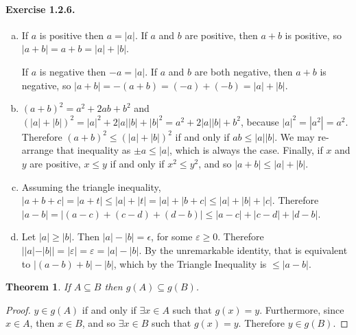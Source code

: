 \documentclass{article}
\newtheorem{theorem}{Theorem}[section]
\begin{document}
\paragraph{Exercise 1.2.6.}
\begin{enumerate}[(a)]
    \item  If $a$ is positive then $a=|a|$. If $a$ and $b$ are positive, then $a+b$ is positive, so $|a+b|=a+b=|a|+|b|$.
    
    If $a$ is negative then $-a=|a|$. If $a$ and $b$ are both negative, then $a+b$ is negative, so $|a+b|=-(a+b)=(-a)+(-b)=|a|+|b|$.

    \item $(a+b)^2=a^2+2ab+b^2$ and $(|a|+|b|)^2=|a|^2+2|a||b|+|b|^2=a^2+2|a||b|+b^2$, because $|a|^2=|a^2|=a^2$. Therefore $(a+b)^2 \leq (|a|+| b|)^2$ if and only if $ab\leq|a||b|$. We may re-arrange that inequality as $\pm a\leq |a|$, which is always the case. Finally, if $x$ and $y$ are positive, $x\leq y$ if and only if $x^2\leq y^2$, and so $|a+b|\leq|a|+|b|$.

    \item Assuming the triangle inequality, $|a+b+c|=|a+t|\leq|a|+|t|=|a|+|b+c|\leq|a|+|b|+|c|$. Therefore $|a-b|=|(a-c)+(c-d)+(d-b)|\leq |a-c|+|c-d|+|d-b|$.

    \item Let $|a|\geq |b|$. Then $|a|-|b|=\epsilon$, for some $\varepsilon \geq0$. Therefore $||a|-|b||=|\varepsilon|=\varepsilon=|a|-|b|$. By the unremarkable identity, that is equivalent to $|(a-b)+b|-|b|$, which by the Triangle Inequality is $\leq |a-b|$.
\end{enumerate}

\begin{theorem}
\label{sub_range}
    If $A \subseteq B$ then $g(A) \subseteq g(B)$.
\end{theorem}
\begin{proof}
    $y\in g(A)$ if and only if $\exists x \in A$ such that $g(x)=y$. Furthermore, since $x\in A$, then $x\in B$, and so $\exists x \in B$ such that $g(x)=y$. Therefore $y\in g(B)$.
\end{proof}
\end{document}

